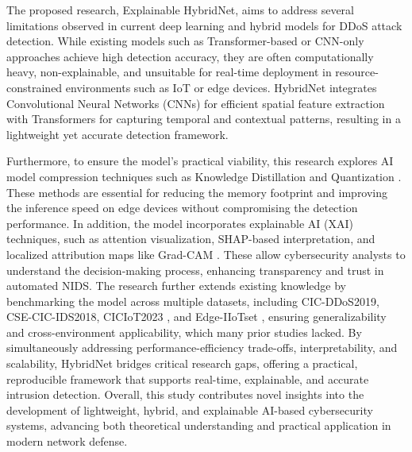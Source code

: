 \documentclass[12pt, a4paper]{report}
\begin{document}
\normalsize
The proposed research, Explainable HybridNet, aims to address several limitations observed in current deep learning and hybrid models for DDoS attack detection. While existing models such as Transformer-based \cite{vaswani2017attention} or CNN-only approaches achieve high detection accuracy, they are often computationally heavy, non-explainable, and unsuitable for real-time deployment in resource-constrained environments such as IoT or edge devices. HybridNet integrates Convolutional Neural Networks (CNNs) for efficient spatial feature extraction with Transformers for capturing temporal and contextual patterns, resulting in a lightweight yet accurate detection framework. 

Furthermore, to ensure the model's practical viability, this research explores AI model compression techniques such as Knowledge Distillation \cite{HintonVD15} and Quantization \cite{Nagel2021AWP}. These methods are essential for reducing the memory footprint and improving the inference speed on edge devices without compromising the detection performance. In addition, the model incorporates explainable AI (XAI) techniques, such as attention visualization, SHAP-based interpretation, and localized attribution maps like Grad-CAM \cite{selvaraju2017gradcam}. These allow cybersecurity analysts to understand the decision-making process, enhancing transparency and trust in automated NIDS. The research further extends existing knowledge by benchmarking the model across multiple datasets, including CIC-DDoS2019, CSE-CIC-IDS2018, CICIoT2023 \cite{neto2023ciciot2023}, and Edge-IIoTset \cite{ferrag2022edge}, ensuring generalizability and cross-environment applicability, which many prior studies lacked. By simultaneously addressing performance-efficiency trade-offs, interpretability, and scalability, HybridNet bridges critical research gaps, offering a practical, reproducible framework that supports real-time, explainable, and accurate intrusion detection. Overall, this study contributes novel insights into the development of lightweight, hybrid, and explainable AI-based cybersecurity systems, advancing both theoretical understanding and practical application in modern network defense.



\end{document}

